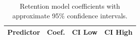 \begin{table}[t]
\centering
\caption{Retention model coefficients with approximate 95\% confidence intervals.}
\label{tab:prediction-results}
\small
\begin{tabular}{lrrr}
\toprule
Predictor & Coef. & CI Low & CI High \\
\midrule

\bottomrule
\end{tabular}
\end{table}
